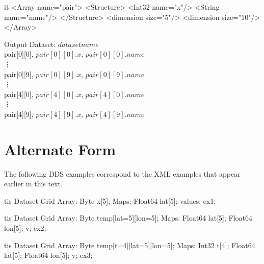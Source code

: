 \documentclass[justify]{dods-paper}
\begin{document}
\begin{enumerate}
\begin{minipage}[t]{2.5in}
\begin{vcode}{it}
<Array name="pair">
  <Structure>
    <Int32 name="x"/>
    <String name="name"/>
  </Structure>
  <dimension size="5"/>
  <dimension size="10"/>
</Array>
\end{vcode}
\end{minipage}
\begin{minipage}[t]{5in}
\begin{textoutput}{Output}
Dataset: $dataset name$\\
pair[0][0], $pair[0][0].x$, $pair[0][0].name$\\
\vdots\\
pair[0][9], $pair[0][9].x$, $pair[0][9].name$\\
\vdots\\
pair[4][0], $pair[4][0].x$, $pair[4][0].name$\\
\vdots\\
pair[4][9], $pair[4][9].x$, $pair[4][9].name$\\
\end{textoutput}
\end{minipage}

\end{enumerate}

\appendix

%
%

\section{Alternate Form}

The following DDS examples correspond to the XML examples that appear
earlier in this text.

\begin{vcode}{tis}
Dataset {
  Grid {
    Array:
      Byte x[5];
    Maps:
      Float64 lat[5];
  } values;
} ex1;
\end{vcode}

\begin{vcode}{tis}
Dataset {
  Grid {
    Array: 
      Byte temp[lat=5][lon=5];
    Maps:
      Float64 lat[5];
      Float64 lon[5];
  } v;
} ex2;
\end{vcode}

\begin{vcode}{tis}
Dataset {
  Grid {
    Array: 
      Byte temp[t=4][lat=5][lon=5];
    Maps:
      Int32 t[4];
      Float64 lat[5];
      Float64 lon[5];
  } v;
} ex3;
\end{vcode}
\end{document}
